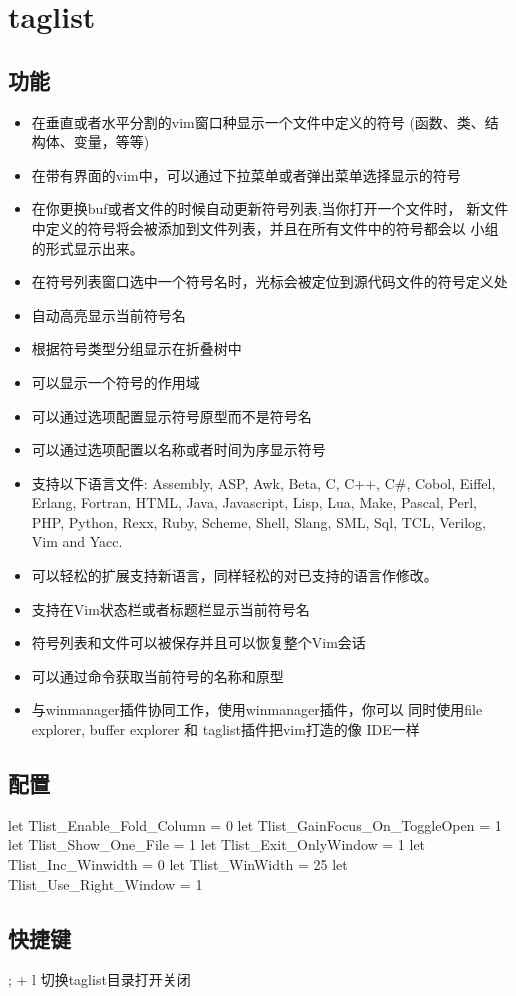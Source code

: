 \chapter{taglist}

\section{功能}
\begin{itemize}
    \item 在垂直或者水平分割的vim窗口种显示一个文件中定义的符号
    (函数、类、结构体、变量，等等)
    \item 在带有界面的vim中，可以通过下拉菜单或者弹出菜单选择显示的符号
    \item 在你更换buf或者文件的时候自动更新符号列表,当你打开一个文件时，
    新文件中定义的符号将会被添加到文件列表，并且在所有文件中的符号都会以
    小组的形式显示出来。
    \item 在符号列表窗口选中一个符号名时，光标会被定位到源代码文件的符号定义处
    \item 自动高亮显示当前符号名
    \item 根据符号类型分组显示在折叠树中
    \item 可以显示一个符号的作用域
    \item 可以通过选项配置显示符号原型而不是符号名
    \item 可以通过选项配置以名称或者时间为序显示符号
    \item 支持以下语言文件: Assembly, ASP, Awk, Beta, C,
      C++, C\#, Cobol, Eiffel, Erlang, Fortran, HTML, Java, Javascript, Lisp,
      Lua, Make, Pascal, Perl, PHP, Python, Rexx, Ruby, Scheme, Shell, Slang,
      SML, Sql, TCL, Verilog, Vim and Yacc.
    \item 可以轻松的扩展支持新语言，同样轻松的对已支持的语言作修改。
    \item 支持在Vim状态栏或者标题栏显示当前符号名
    \item 符号列表和文件可以被保存并且可以恢复整个Vim会话
    \item 可以通过命令获取当前符号的名称和原型
    \item 与winmanager插件协同工作，使用winmanager插件，你可以
    同时使用file explorer, buffer explorer 和 taglist插件把vim打造的像
    IDE一样
\end{itemize}

\section{配置}
\begin{code}
let Tlist_Enable_Fold_Column = 0
let Tlist_GainFocus_On_ToggleOpen = 1
let Tlist_Show_One_File = 1
let Tlist_Exit_OnlyWindow = 1
let Tlist_Inc_Winwidth = 0
let Tlist_WinWidth = 25
let Tlist_Use_Right_Window = 1
\end{code}

\section{快捷键}
; + l 切换taglist目录打开关闭

\newpage
